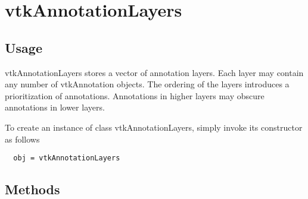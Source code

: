 \section{vtkAnnotationLayers}

\subsection{Usage}

 vtkAnnotationLayers stores a vector of annotation layers. Each layer
 may contain any number of vtkAnnotation objects. The ordering of the
 layers introduces a prioritization of annotations. Annotations in
 higher layers may obscure annotations in lower layers.

To create an instance of class vtkAnnotationLayers, simply
invoke its constructor as follows
\begin{verbatim}
  obj = vtkAnnotationLayers
\end{verbatim}
\subsection{Methods}

